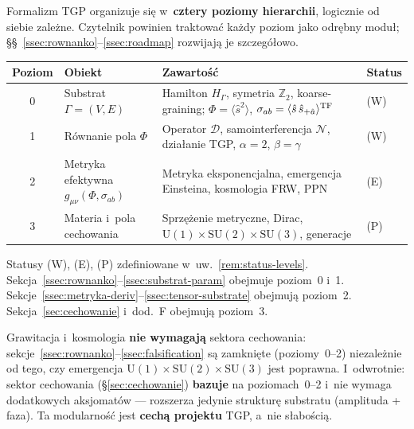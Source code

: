 \begin{remark}\label{rem:hierarchia-sektorow}
Formalizm TGP organizuje si\k{e} w~\textbf{cztery poziomy hierarchii},
logicznie od siebie zale\.zne. Czytelnik powinien traktowa\'c ka\.zdy
poziom jako odr\k{e}bny modu\l{}; \S\S~\ref{ssec:rownanko}--\ref{ssec:roadmap}
rozwijaj\k{a} je szczeg\'o\l{}owo.

\medskip
\begin{center}\small
\begin{tabular}{@{}clp{6.0cm}l@{}}
\toprule
\textbf{Poziom} & \textbf{Obiekt} & \textbf{Zawarto\'s\'c} & \textbf{Status} \\
\midrule
0 & Substrat $\Gamma = (V,E)$ &
  Hamilton $H_\Gamma$, symetria $\mathbb{Z}_2$,
  koarse-graining; $\Phi = \langle\hat{s}^2\rangle$,
  $\sigma_{ab} = \langle\hat{s}\,\hat{s}_{+\hat{a}}\rangle^{\rm TF}$
  & (W) \\[4pt]
1 & R\'ownanie pola $\Phi$ &
  Operator $\mathcal{D}$, samointerferencja $\mathcal{N}$,
  dzia\l{}anie TGP, $\alpha=2$, $\beta=\gamma$
  & (W) \\[4pt]
2 & Metryka efektywna $g_{\mu\nu}(\Phi,\sigma_{ab})$ &
  Metryka eksponencjalna, emergencja Einsteina,
  kosmologia FRW, PPN
  & (E) \\[4pt]
3 & Materia i~pola cechowania &
  Sprzężenie metryczne, Dirac, $\mathrm{U}(1)\times\mathrm{SU}(2)
  \times\mathrm{SU}(3)$, generacje
  & (P) \\
\bottomrule
\end{tabular}
\end{center}

\medskip
\noindent Statusy (W), (E), (P) zdefiniowane w~uw.~\ref{rem:status-levels}.
Sekcja~\ref{ssec:rownanko}--\ref{ssec:substrat-param} obejmuje poziom~0 i~1.
Sekcje~\ref{ssec:metryka-deriv}--\ref{ssec:tensor-substrate} obejmuj\k{a} poziom~2.
Sekcja~\ref{sec:cechowanie} i~dod.~F obejmuj\k{a} poziom~3.
\end{remark}

\begin{remark}\label{rem:niezaleznosc}
Grawitacja i~kosmologia \textbf{nie wymagaj\k{a}} sektora cechowania:
sekcje~\ref{ssec:rownanko}--\ref{ssec:falsification} s\k{a} zamkni\k{e}te
(poziomy~0--2) niezale\.znie od tego, czy emergencja $\mathrm{U}(1)\times
\mathrm{SU}(2)\times\mathrm{SU}(3)$ jest poprawna.
I~odwrotnie: sektor cechowania (\S\ref{sec:cechowanie}) \textbf{bazuje}
na poziomach~0--2 i~nie wymaga dodatkowych aksjomat\'ow ---
rozszerza jedynie struktur\k{e} substratu (amplituda + faza).
Ta modularno\'s\'c jest \textbf{cech\k{a} projektu} TGP, a~nie s\l{}abo\'sci\k{a}.
\end{remark}

